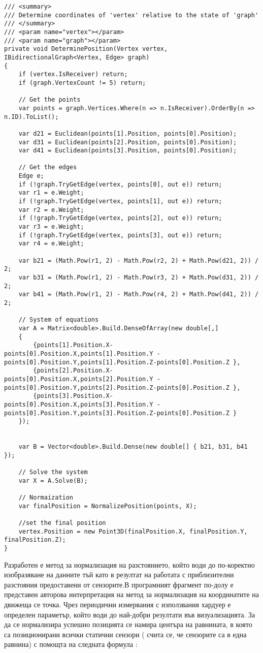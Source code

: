 \begin{lstlisting}
/// <summary>
/// Determine coordinates of 'vertex' relative to the state of 'graph'
/// </summary>
/// <param name="vertex"></param>
/// <param name="graph"></param>
private void DeterminePosition(Vertex vertex, IBidirectionalGraph<Vertex, Edge> graph)
{
    if (vertex.IsReceiver) return;
    if (graph.VertexCount != 5) return;

    // Get the points
    var points = graph.Vertices.Where(n => n.IsReceiver).OrderBy(n => n.ID).ToList();

    var d21 = Euclidean(points[1].Position, points[0].Position);
    var d31 = Euclidean(points[2].Position, points[0].Position);
    var d41 = Euclidean(points[3].Position, points[0].Position);

    // Get the edges
    Edge e;
    if (!graph.TryGetEdge(vertex, points[0], out e)) return;
    var r1 = e.Weight;
    if (!graph.TryGetEdge(vertex, points[1], out e)) return;
    var r2 = e.Weight;
    if (!graph.TryGetEdge(vertex, points[2], out e)) return;
    var r3 = e.Weight;
    if (!graph.TryGetEdge(vertex, points[3], out e)) return;
    var r4 = e.Weight;

    var b21 = (Math.Pow(r1, 2) - Math.Pow(r2, 2) + Math.Pow(d21, 2)) / 2;
    var b31 = (Math.Pow(r1, 2) - Math.Pow(r3, 2) + Math.Pow(d31, 2)) / 2;
    var b41 = (Math.Pow(r1, 2) - Math.Pow(r4, 2) + Math.Pow(d41, 2)) / 2;

    // System of equations
    var A = Matrix<double>.Build.DenseOfArray(new double[,]
    {
        {points[1].Position.X-points[0].Position.X,points[1].Position.Y - points[0].Position.Y,points[1].Position.Z-points[0].Position.Z },
        {points[2].Position.X-points[0].Position.X,points[2].Position.Y - points[0].Position.Y,points[2].Position.Z-points[0].Position.Z },
        {points[3].Position.X-points[0].Position.X,points[3].Position.Y - points[0].Position.Y,points[3].Position.Z-points[0].Position.Z }
    });
    
    
    var B = Vector<double>.Build.Dense(new double[] { b21, b31, b41 });
    
    // Solve the system
    var X = A.Solve(B);

    // Normaization
    var finalPosition = NormalizePosition(points, X);
    
    //set the final position
    vertex.Position = new Point3D(finalPosition.X, finalPosition.Y, finalPosition.Z);
}
\end{lstlisting}

Разработен е метод за нормализация на разстоянието, който води до по-коректно изобразяване на данните тъй като в резултат на работата с приблизителни разстояния предоставени от сензорите.В програмният фрагмент по-долу е представен авторова интерпретация на метод за нормализация на координатите на движеща се точка. Чрез периодични измервания с използвания хардуер е определен параметър, който води до най-добри резултати във визуализацията. За да се нормализира успешно позицията се намира центъра на равнината, в която са позиционирани всички статични сензори ( счита се, че сензорите са в една равнина) с помощта на следната формула :

